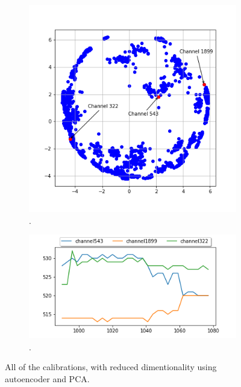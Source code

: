 \begin{figure}
    \centering
    
    \begin{subfigure}[b]{.5\textwidth}
    \includegraphics[width=\linewidth]{figures/chapter4/dimred/selected_channels_ped.png}
    \caption{ .}
   \label{plot:PCA_selected}
  \end{subfigure}\begin{subfigure}[b]{.5\textwidth}
    \includegraphics[width=\linewidth]{figures/chapter4/dimred/PCA_trends_channel.png}
    \caption{ .}
   \label{plot:PCA_trend}
  \end{subfigure}
      \caption[All calond]{All of the calibrations, with reduced dimentionality using autoencoder and PCA.}
    \label{plot:pca_all}
  
  \end{figure}





